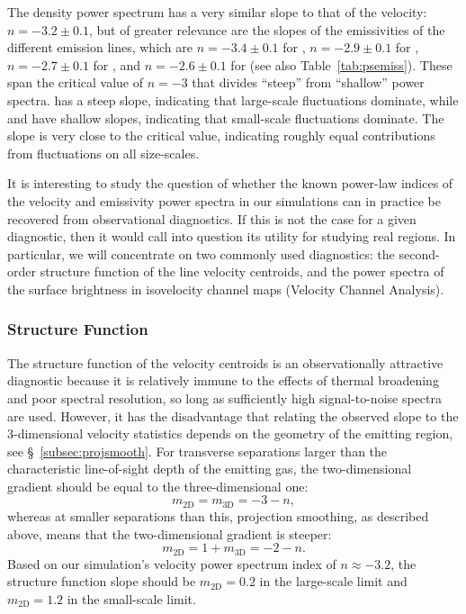 \documentclass[useAMS,usenatbib]{mn2e}
\begin{document}
The density power spectrum has a very similar slope to that of the velocity: \(n = -3.2 \pm 0.1\),
but of greater relevance
are the slopes of the emissivities of the different emission lines,
which are \(n = -3.4 \pm 0.1\) for \oiii{}, 
\(n = -2.9 \pm 0.1\) for \ha,
\(n = -2.7 \pm 0.1\) for \nii, and
\(n = -2.6 \pm 0.1\) for \sii (see also Table~\ref{tab:psemiss}).
These span the critical value of \(n = -3\)
that divides ``steep'' from ``shallow'' power spectra.
\oiii{} has a steep slope,
indicating that large-scale fluctuations dominate,
while \nii{} and \sii{} have shallow slopes,
indicating that small-scale fluctuations dominate. 
The \ha{} slope is very close to the critical value,
indicating roughly equal contributions from fluctuations on all size-scales.

It is interesting to study the question of whether
the known power-law indices of the velocity and emissivity power spectra in our simulations
can in practice be recovered from observational diagnostics.  
If this is not the case for a given diagnostic,
then it would call into question its utility for studying real \hii{} regions.
In particular, we will concentrate on two commonly used diagnostics:
the second-order structure function of the line velocity centroids,
and the power spectra of the surface brightness in isovelocity channel maps
(Velocity Channel Analysis). 

\subsubsection{Structure Function}
\label{sssec:strfunc}
The structure function of the velocity centroids is an observationally attractive diagnostic
because it is relatively immune to the effects of thermal broadening 
and poor spectral resolution,
so long as sufficiently high signal-to-noise spectra are used. 
However, it has the disadvantage that relating the observed slope 
to the 3-dimensional velocity statistics depends on the geometry
of the emitting region, see \S~\ref{subsec:projsmooth}. 
For transverse separations larger than
the characteristic line-of-sight depth of the emitting gas,
the two-dimensional gradient should be equal to the three-dimensional one:
\[
m_{\mathrm{2D}} = m_{\mathrm{3D}} = -3 - n,
\]
whereas at smaller separations than this, 
projection smoothing, as described above, means that 
the two-dimensional gradient is steeper:
\[
m_{\mathrm{2D}} = 1 + m_{\mathrm{3D}} = -2 - n.
\]
Based on our simulation's velocity power spectrum index of \(n \approx -3.2\), 
the structure function slope should be \(m_{\mathrm{2D}} = 0.2\) in the large-scale limit
and \(m_{\mathrm{2D}} = 1.2\) in the small-scale limit. 
\end{document}
